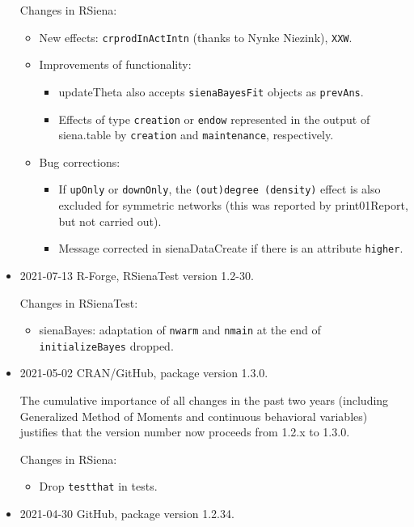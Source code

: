 \documentclass[a4paper,fleqn,11pt]{article}
\newcommand{\+}{\, + \,}
\newcommand{\sfn}[1]{\textsf{#1}}
\begin{document}
\begin{small}
\begin{itemize}
Changes in RSiena:
\begin{itemize}
\item New effects: \texttt{crprodInActIntn} (thanks to Nynke Niezink),
    \texttt{XXW}.
\item Improvements of functionality:
   \begin{itemize}
   \item \sfn{updateTheta} also accepts \texttt{sienaBayesFit} objects
     as \texttt{prevAns}.
   \item Effects of type \texttt{creation} or \texttt{endow} represented in the output of
   \sfn{siena.table} by \texttt{creation} and \texttt{maintenance}, respectively.
    \end{itemize}
\item Bug corrections:
   \begin{itemize}
   \item If \texttt{upOnly} or \texttt{downOnly},
     the \texttt{(out)degree (density)} effect is also excluded
     for symmetric networks
     (this was reported by \sfn{print01Report}, but not carried out).
   \item Message corrected in \sfn{sienaDataCreate} if there is an attribute
   \texttt{higher}.
    \end{itemize}
\end{itemize}


\item 2021-07-13  R-Forge, \sfn{RSienaTest} version 1.2-30.

Changes in RSienaTest:
\begin{itemize}
\item \sfn{sienaBayes}: adaptation of \texttt{nwarm} and \texttt{nmain}
     at the end of \texttt{initializeBayes} dropped.
\end{itemize}

\item 2021-05-02 CRAN/GitHub, package version 1.3.0.
\medskip

The cumulative importance of all changes in the past two years
(including Generalized Method of Moments and continuous
behavioral variables) justifies that the version number
now proceeds from 1.2.x to 1.3.0.

Changes in RSiena:
\begin{itemize}
\item Drop \texttt{testthat} in \sfn{tests}.
\end{itemize}


\item 2021-04-30 GitHub, package version 1.2.34.


\end{itemize}
\end{small}
\end{document}
